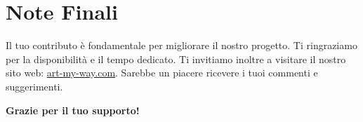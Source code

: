 \documentclass{article}
\begin{document}
\section{Note Finali}
Il tuo contributo \`e fondamentale per migliorare il nostro progetto. Ti ringraziamo per la disponibilit\`a e il tempo dedicato.
Ti invitiamo inoltre a visitare il nostro sito web: \href{https://art-my-way.com}{art-my-way.com}. Sarebbe un piacere ricevere i tuoi commenti e suggerimenti.

\vspace{1cm}
\noindent\textbf{Grazie per il tuo supporto!}
\end{document}
